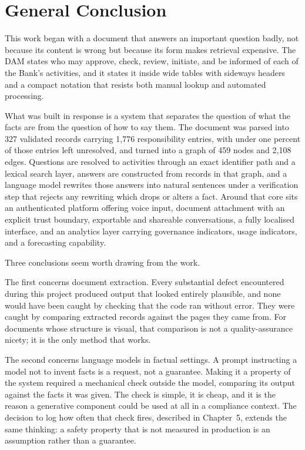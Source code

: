\chapter*{General Conclusion}

This work began with a document that answers an important question badly, not because its content is wrong but because its form makes retrieval expensive. The DAM states who may approve, check, review, initiate, and be informed of each of the Bank's activities, and it states it inside wide tables with sideways headers and a compact notation that resists both manual lookup and automated processing.

What was built in response is a system that separates the question of what the facts are from the question of how to say them. The document was parsed into 327 validated records carrying 1,776 responsibility entries, with under one percent of those entries left unresolved, and turned into a graph of 459 nodes and 2,108 edges. Questions are resolved to activities through an exact identifier path and a lexical search layer, answers are constructed from records in that graph, and a language model rewrites those answers into natural sentences under a verification step that rejects any rewriting which drops or alters a fact. Around that core sits an authenticated platform offering voice input, document attachment with an explicit trust boundary, exportable and shareable conversations, a fully localised interface, and an analytics layer carrying governance indicators, usage indicators, and a forecasting capability.

Three conclusions seem worth drawing from the work.

The first concerns document extraction. Every substantial defect encountered during this project produced output that looked entirely plausible, and none would have been caught by checking that the code ran without error. They were caught by comparing extracted records against the pages they came from. For documents whose structure is visual, that comparison is not a quality-assurance nicety; it is the only method that works.

The second concerns language models in factual settings. A prompt instructing a model not to invent facts is a request, not a guarantee. Making it a property of the system required a mechanical check outside the model, comparing its output against the facts it was given. The check is simple, it is cheap, and it is the reason a generative component could be used at all in a compliance context. The decision to log how often that check fires, described in Chapter~5, extends the same thinking: a safety property that is not measured in production is an assumption rather than a guarantee.

